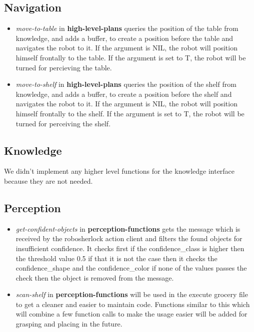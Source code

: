 \documentclass[main.tex]{subfiles}
\begin{document}
                \subsection{Navigation}
                  \begin{itemize}
                    \item \textit{move-to-table} in \textbf{high-level-plans} queries the position of the table from knowledge, and adds a buffer, to create a position before the table and navigates the robot to it. If the argument is NIL, the robot will position himself frontally to the table. If the argument is set to T, the robot will be turned for percieving the table.
                    \item \textit{move-to-shelf} in \textbf{high-level-plans} queries the position of the shelf from knowledge, and adds a buffer, to create a position before the shelf and navigates the robot to it. If the argument is NIL, the robot will position himself frontally to the shelf. If the argument is set to T, the robot will be turned for perceiving the shelf.
                  \end{itemize}
                \subsection{Knowledge}
                We didn't implement any higher level functions for the knowledge interface because they are not needed.
                \subsection{Perception}
	                \begin{itemize}
	                	\item  \textit{get-confident-objects} in \textbf{perception-functions} gets the message which is received by the robosherlock action client and filters the found objects for insufficient confidence. It checks first if the confidence\_class is higher then the threshold value 0.5 if that it is not the case then it checks the confidence\_shape and the confidence\_color if none of the values passes the check then the object is removed from the message.
	                	\item \textit{scan-shelf} in \textbf{perception-functions} will be used in the execute grocery file to get a cleaner and easier to maintain code. Functions similar to this which will combine a few function calls to make the usage easier will be added for grasping and placing in the future.
	                \end{itemize}
\end{document}
